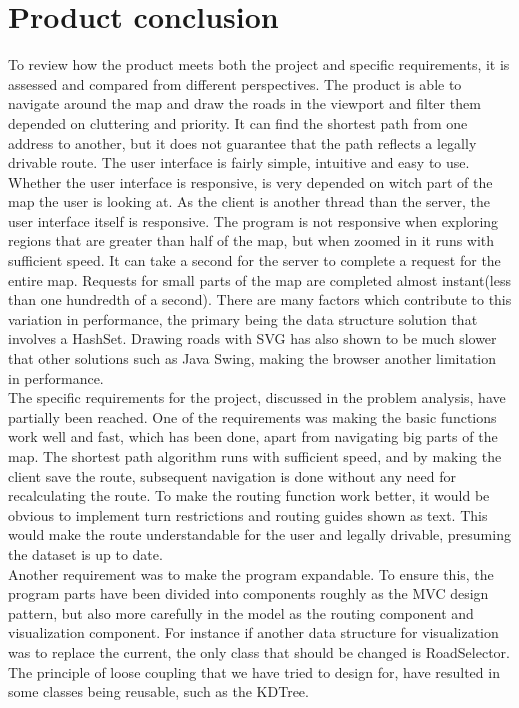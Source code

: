 \documentclass[a4paper,10pt,titlepage]{article}
\begin{document}
	\section{Product conclusion}
	To review how the product meets both the project and specific requirements, it is assessed and compared from different perspectives. The product is able to navigate around the map and draw the roads in the viewport and filter them depended on cluttering and priority. It can find the shortest path from one address to another, but it does not guarantee that the path reflects a legally drivable route. The user interface is fairly simple, intuitive and easy to use. Whether the user interface is responsive, is very depended on witch part of the map the user is looking at. As the client is another thread than the server, the user interface itself is responsive. The program is not responsive when exploring regions that are greater than half of the map, but when zoomed in it runs with sufficient speed. It can take a second for the server to complete a request for the entire map. Requests for small parts of the map are completed almost instant(less than one hundredth of a second). There are many factors which contribute to this variation in performance, the primary being the data structure solution that involves a HashSet. Drawing roads with SVG has also shown to be much slower that other solutions such as Java Swing, making the browser another limitation in performance.\\
The specific requirements for the project, discussed in the problem analysis, have partially been reached. One of the requirements was making the basic functions work well and fast, which has been done, apart from navigating big parts of the map. The shortest path algorithm runs with sufficient speed, and by making the client save the route, subsequent navigation is done without any need for recalculating the route. To make the routing function work better, it would be obvious to implement turn restrictions and routing guides shown as text. This would make the route understandable for the user and legally drivable, presuming the dataset is up to date.\\
Another requirement was to make the program expandable. To ensure this, the program parts have been divided into components roughly as the MVC design pattern, but also more carefully in the model as the routing component and visualization component. For instance if another data structure for visualization was to replace the current, the only class that should be changed is RoadSelector. The principle of loose coupling that we have tried to design for, have resulted in some classes being reusable, such as the KDTree.\\
\end{document}
